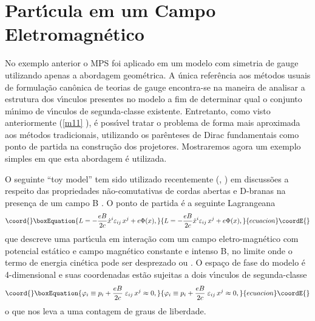 \documentclass[a4paper,thmsa,12pt]{report}
\begin{document}
\section{{\sc Part\'{\i}cula em um Campo Eletromagn\'etico}}

No exemplo anterior o MPS foi aplicado em um modelo com simetria de gauge
utilizando apenas a abordagem geom\'{e}trica. A \'{u}nica refer\^{e}ncia aos
m\'{e}todos usuais de formula\c{c}\~{a}o can\^{o}nica de teorias de gauge
encontra-se na maneira de analisar a estrutura dos v\'{\i}nculos presentes
no modelo a fim de determinar qual o conjunto m\'{\i}nimo de v\'{\i}nculos
de segunda-classe existente. Entretanto, como visto anteriormente (\ref{m11}%
), \'{e} poss\'{\i}vel tratar o problema de forma mais aproximada aos
m\'{e}todos tradicionais, utilizando os par\^{e}nteses de Dirac fundamentais
como ponto de partida na constru\c{c}\~{a}o dos projetores. Mostraremos
agora um exemplo simples em que esta abordagem \'{e} utilizada.

O seguinte ``toy model'' tem sido utilizado recentemente (\cite{bigatti}, 
\cite{kim}) em discuss\~{o}es a respeito das propriedades
n\~{a}o-comutativas de cordas abertas e D-branas na presen\c{c}a de um campo
B \cite{mmi}. O ponto de partida \'{e} a seguinte Lagrangeana 
\begin{equation}\coord{}\boxEquation{
L=-\frac{eB}{2c}\dot{x}^{i}\varepsilon _{ij}\,x^{j}+e\Phi (x),  \label{2.13}
}{
L=-\frac{eB}{2c}\dot{x}^{i}\varepsilon _{ij}\,x^{j}+e\Phi (x),  }{ecuacion}\coordE{}\end{equation}
que descreve uma part\'{\i}cula em intera\c{c}\~{a}o com um campo
eletro-magn\'{e}tico com potencial est\'{a}tico \coordHE{} e campo
magn\'{e}tico constante e intenso B, no limite onde o termo de energia
cin\'{e}tica pode ser desprezado ou \coordHE{}. O espa\c{c}o de fase
do modelo \'{e} 4-dimensional e suas coordenadas est\~{a}o sujeitas a dois
v\'{\i}nculos de segunda-classe 
\begin{equation}\coord{}\boxEquation{
\varphi _{i}\equiv p_{i}+\frac{eB}{2c}\;\varepsilon _{ij}\,x^{j}\approx 0,
\label{2.14}
}{
\varphi _{i}\equiv p_{i}+\frac{eB}{2c}\;\varepsilon _{ij}\,x^{j}\approx 0,
}{ecuacion}\coordE{}\end{equation}
o que nos leva a uma contagem de \coordHE{} graus de liberdade.
\end{document}
